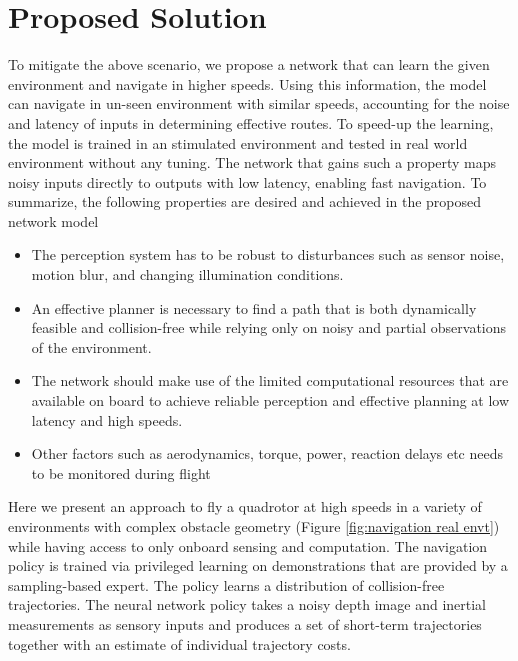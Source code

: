 \section{Proposed Solution}
To mitigate the above scenario, we propose a network that can learn the given environment and navigate in higher speeds. Using this information, the model can navigate in un-seen environment with similar speeds, accounting for the noise and latency of inputs in determining effective routes. To speed-up the learning, the model is trained in an stimulated environment and tested in real world environment without any tuning. The network that gains such a property maps noisy inputs directly to outputs with low latency, enabling fast navigation. To summarize, the following properties are desired and achieved in the proposed network model

\begin{itemize}
	\item The perception system has to be robust to disturbances such
as sensor noise, motion blur, and changing illumination
conditions.
	\item An effective planner is necessary to find a path that is both
dynamically feasible and collision-free while relying only on
 noisy and partial observations of the environment.
	\item The network should make use of the limited computational resources that are available on
board to achieve reliable perception and
effective planning at low latency and high speeds.
	\item Other factors such as aerodynamics, torque, power, reaction
delays etc needs to be monitored during flight
\end{itemize}

Here we present an approach to fly a quadrotor at high speeds in
a variety of environments with complex obstacle geometry (Figure \ref{fig:navigation real envt}) while having access to only onboard sensing and computation. The navigation policy is trained via privileged learning on
demonstrations that are provided by a sampling-based expert. The policy learns a distribution
of collision-free trajectories. The neural network policy takes a
noisy depth image and inertial measurements as sensory inputs and
produces a set of short-term trajectories together with an estimate of
individual trajectory costs. 